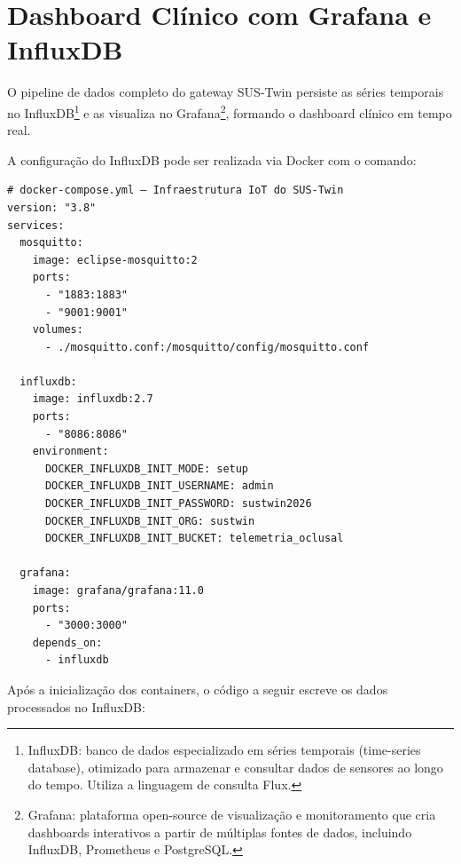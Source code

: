 \section{Dashboard Clínico com Grafana e InfluxDB}

O pipeline de dados completo do gateway SUS-Twin persiste as séries temporais no InfluxDB\footnote{InfluxDB: banco de dados especializado em séries temporais (time-series database), otimizado para armazenar e consultar dados de sensores ao longo do tempo. Utiliza a linguagem de consulta Flux.} e as visualiza no Grafana\footnote{Grafana: plataforma open-source de visualização e monitoramento que cria dashboards interativos a partir de múltiplas fontes de dados, incluindo InfluxDB, Prometheus e PostgreSQL.}, formando o dashboard clínico em tempo real.

A configuração do InfluxDB pode ser realizada via Docker com o comando:

\begin{lstlisting}[style=bashstyle, caption=Inicialização do InfluxDB e Mosquitto via Docker Compose, label=cod:docker]
# docker-compose.yml — Infraestrutura IoT do SUS-Twin
version: "3.8"
services:
  mosquitto:
    image: eclipse-mosquitto:2
    ports:
      - "1883:1883"
      - "9001:9001"
    volumes:
      - ./mosquitto.conf:/mosquitto/config/mosquitto.conf

  influxdb:
    image: influxdb:2.7
    ports:
      - "8086:8086"
    environment:
      DOCKER_INFLUXDB_INIT_MODE: setup
      DOCKER_INFLUXDB_INIT_USERNAME: admin
      DOCKER_INFLUXDB_INIT_PASSWORD: sustwin2026
      DOCKER_INFLUXDB_INIT_ORG: sustwin
      DOCKER_INFLUXDB_INIT_BUCKET: telemetria_oclusal

  grafana:
    image: grafana/grafana:11.0
    ports:
      - "3000:3000"
    depends_on:
      - influxdb
\end{lstlisting}

Após a inicialização dos containers, o código a seguir escreve os dados processados no InfluxDB:

